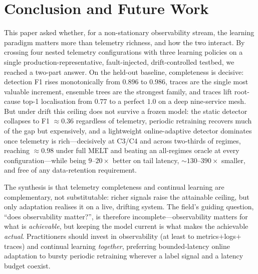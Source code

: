 \documentclass[pdflatex,sn-mathphys-num]{sn-jnl}%
\theoremstyle{thmstyleone}%
\theoremstyle{thmstyletwo}%
\theoremstyle{thmstylethree}%
\begin{document}

\section{Conclusion and Future Work}\label{sec:conclusion}

This paper asked whether, for a non-stationary observability stream, the learning paradigm matters more than telemetry richness, and how the two interact. By crossing four nested telemetry configurations with three learning policies on a single production-representative, fault-injected, drift-controlled testbed, we reached a two-part answer. On the held-out baseline, completeness is decisive: detection F1 rises monotonically from $0.896$ to $0.986$, traces are the single most valuable increment, ensemble trees are the strongest family, and traces lift root-cause top-1 localisation from $0.77$ to a perfect $1.0$ on a deep nine-service mesh. But under drift this ceiling does not survive a frozen model: the static detector collapses to F1 $\approx 0.36$ regardless of telemetry, periodic retraining recovers much of the gap but expensively, and a lightweight online-adaptive detector dominates once telemetry is rich---decisively at C3/C4 and across two-thirds of regimes, reaching $\approx 0.98$ under full MELT and beating an all-regimes oracle at every configuration---while being $9$--$20\times$ better on tail latency, $\sim 130$--$390\times$ smaller, and free of any data-retention requirement.

The synthesis is that telemetry completeness and continual learning are complementary, not substitutable: richer signals raise the attainable ceiling, but only adaptation realises it on a live, drifting system. The field's guiding question, ``does observability matter?'', is therefore incomplete---observability matters for what is \emph{achievable}, but keeping the model current is what makes the achievable \emph{actual}. Practitioners should invest in observability (at least to metrics${+}$logs${+}$traces) and continual learning \emph{together}, preferring bounded-latency online adaptation to bursty periodic retraining wherever a label signal and a latency budget coexist.
\end{document}
